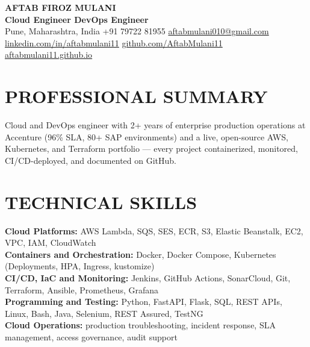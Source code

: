 \documentclass[10pt,a4paper]{article}
\newcommand{\skill}[2]{%
  \textbf{\color{brandblue}#1:} #2\\[1pt]%
}
\begin{document}
\small

\begin{center}
  {\fontsize{20}{22}\selectfont\bfseries\color{brandblue}AFTAB FIROZ MULANI}\\[2pt]
  {\normalsize\bfseries Cloud Engineer \textcolor{rulegray}{\textbar{}} DevOps Engineer}\\[3pt]
  {\small Pune, Maharashtra, India \textcolor{rulegray}{\textbar{}} +91 79722 81955 \textcolor{rulegray}{\textbar{}}
  \href{mailto:aftabmulani010@gmail.com}{\textcolor{brandblue}{aftabmulani010@gmail.com}}}\\[1pt]
  {\small \href{https://www.linkedin.com/in/aftabmulani11}{\textcolor{brandblue}{linkedin.com/in/aftabmulani11}}
  \textcolor{rulegray}{\textbar{}}
  \href{https://github.com/AftabMulani11}{\textcolor{brandblue}{github.com/AftabMulani11}}
  \textcolor{rulegray}{\textbar{}}
  \href{https://aftabmulani11.github.io/}{\textcolor{brandblue}{aftabmulani11.github.io}}}
\end{center}
\vspace{2pt}

\section{PROFESSIONAL SUMMARY}
Cloud and DevOps engineer with 2+ years of enterprise production operations at Accenture (96\% SLA, 80+ SAP environments) and a live, \mbox{open-source} AWS, Kubernetes, and Terraform portfolio --- every project containerized, monitored, CI/CD-deployed, and documented on GitHub.

\section{TECHNICAL SKILLS}
\skill{Cloud Platforms}{AWS Lambda, SQS, SES, ECR, S3, Elastic Beanstalk, EC2, VPC, IAM, CloudWatch}
\skill{Containers and Orchestration}{Docker, Docker Compose, Kubernetes (Deployments, HPA, Ingress, kustomize)}
\skill{CI/CD, IaC and Monitoring}{Jenkins, GitHub Actions, SonarCloud, Git, Terraform, Ansible, Prometheus, Grafana}
\skill{Programming and Testing}{Python, FastAPI, Flask, SQL, REST APIs, Linux, Bash, Java, Selenium, REST Assured, TestNG}
\skill{Cloud Operations}{production troubleshooting, incident response, SLA management, access governance, audit support}
\end{document}
